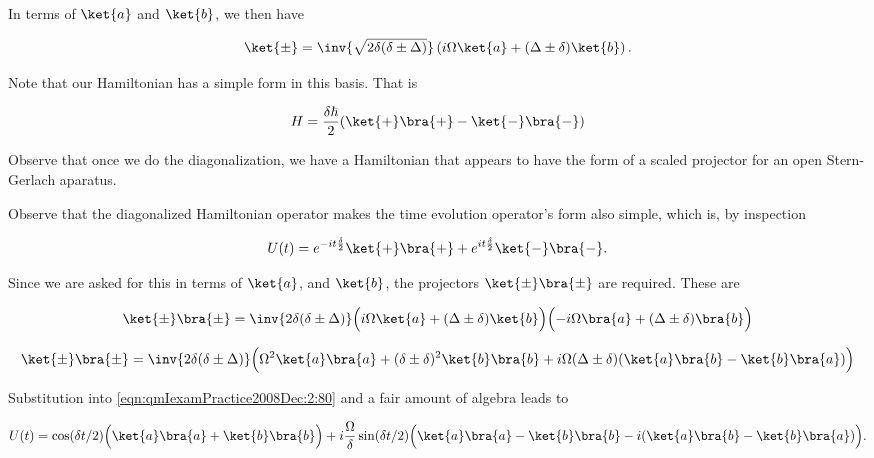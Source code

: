 In terms of $\ket{a}$ and $\ket{b}$, we then have

\begin{equation}\label{eqn:qmIexamPractice2008Dec:2:60}
\ket{\pm} = \inv{\sqrt{ 2 \delta (\delta \pm \Delta)} }
\left(
i \Omega \ket{a}
+ (\Delta \pm \delta) \ket{b} \right).
\end{equation}

Note that our Hamiltonian has a simple form in this basis.  That is

\begin{equation}\label{eqn:qmIexamPractice2008Dec:2:70}
H = \frac{\delta \hbar}{2} (\ket{+}\bra{+} - \ket{-}\bra{-} )
\end{equation}

Observe that once we do the diagonalization, we have a Hamiltonian that appears to have the form of a scaled projector for an open Stern-Gerlach aparatus.

Observe that the diagonalized Hamiltonian operator makes the time evolution operator's form also simple, which is, by inspection

\begin{equation}\label{eqn:qmIexamPractice2008Dec:2:80}
U(t) = 
e^{-i t \frac{\delta}{2}} \ket{+}\bra{+} 
+ e^{i t \frac{\delta}{2}} \ket{-}\bra{-}.
\end{equation}

Since we are asked for this in terms of $\ket{a}$, and $\ket{b}$, the projectors $\ket{\pm}\bra{\pm}$ are required.  These are

\begin{align*}
\ket{\pm}\bra{\pm} 
&= \inv{2 \delta (\delta \pm \Delta)}
\Bigl( i \Omega \ket{a} + (\Delta \pm \delta) \ket{b} \Bigr)
\Bigl( -i \Omega \bra{a} + (\Delta \pm \delta) \bra{b} \Bigr) \\
\end{align*}

\begin{equation}\label{eqn:qmIexamPractice2008Dec:2:90}
\ket{\pm}\bra{\pm} 
= \inv{2 \delta (\delta \pm \Delta)}
\Bigl(
\Omega^2 \ket{a}\bra{a}
+(\delta \pm \delta)^2 \ket{b}\bra{b}
+i \Omega (\Delta \pm \delta) (
\ket{a}\bra{b}
-\ket{b}\bra{a}
)
\Bigr)
\end{equation}

Substitution into \ref{eqn:qmIexamPractice2008Dec:2:80} and a fair amount of algebra leads to

\begin{equation}\label{eqn:qmIexamPractice2008Dec:2:100}
U(t) = 
\cos(\delta t/2) \Bigl( \ket{a}\bra{a} + \ket{b}\bra{b} \Bigr)
+ i \frac{\Omega}{\delta} \sin(\delta t/2) \Bigl( 
\ket{a}\bra{a} - \ket{b}\bra{b} 
-i (\ket{a}\bra{b} - \ket{b}\bra{a} )
\Bigr).
\end{equation}

